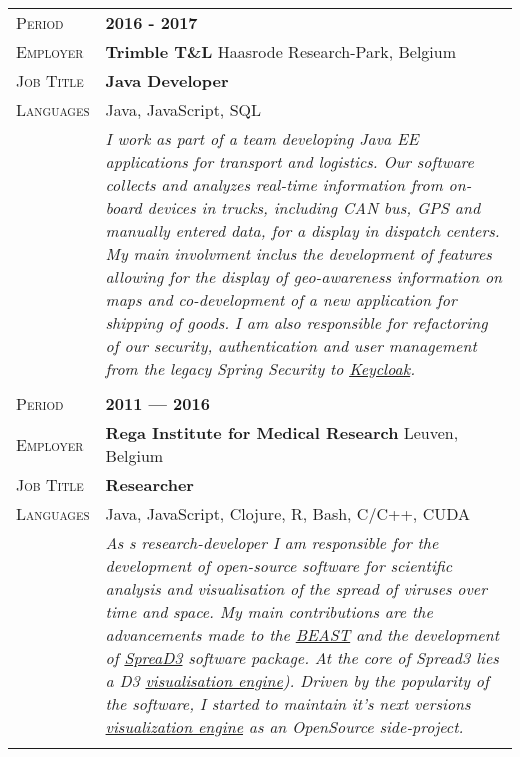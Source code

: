 \documentclass[a4paper, oneside, final]{scrartcl}
\newcommand{\gray}{\rowcolor[gray]{.90}}
\begin{document}
\begin{center}
\begin{tabularx}{0.97\linewidth}{>{\raggedleft\scshape}p{2cm}X}
\gray Period    & \textbf{2016 - 2017}\\
\gray Employer  & \textbf{Trimble T\&L} \hfill Haasrode Research-Park, Belgium\\
\gray Job Title & \textbf{Java Developer}\\
\gray Languages & Java, JavaScript, SQL\\
\gray           &  {\textit{I work as part of a team developing Java EE applications for transport and logistics.
Our software collects and analyzes real-time information from on-board devices in trucks, including CAN bus, GPS and manually entered data, for a display in dispatch centers.
My main involvment inclus the development of features allowing for the display of geo-awareness information on maps and co-development of a new application for shipping of goods.
I am also responsible for refactoring of our security, authentication and user management from the legacy Spring Security to \href{http://www.keycloak.org/}{Keycloak}.}}\\ \\
\gray Period    & \textbf{2011 --- 2016}\\
\gray Employer  & \textbf{Rega Institute for Medical Research} \hfill Leuven, Belgium\\
\gray Job Title & \textbf{Researcher}\\
\gray Languages & Java, JavaScript, Clojure, R, Bash, C/C++, CUDA\\
\gray           &   {\textit {As s research-developer I am responsible for the development of open-source software for scientific analysis and visualisation of the spread of viruses over time and space.
    My main contributions are the advancements made to the \href{https://github.com/beast-dev/beast-mcmc}{BEAST} and the development of \href{https://github.com/phylogeography/SpreaD3}{SpreaD3} software package.
    At the core of Spread3 lies a D3 \href{https://github.com/phylogeography/d3-renderer}{visualisation engine}).
    Driven by the popularity of the software, I started to maintain it's next versions \href{https://github.com/fbielejec/spread}{visualization engine} as an OpenSource side-project.}}\\ \\

\end{tabularx}
\end{center}
\end{document}
